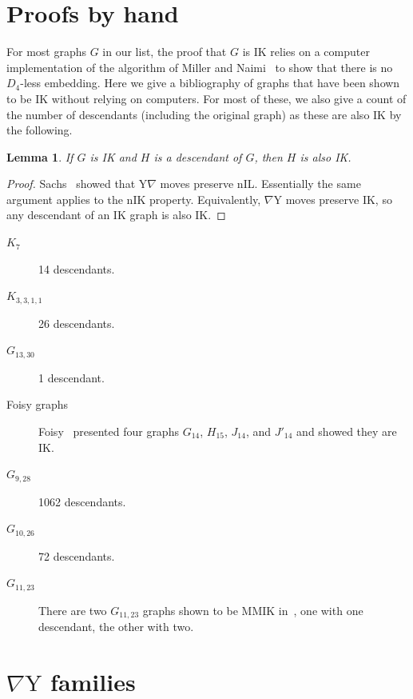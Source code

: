 \documentclass{amsart}
\newtheorem{lemma}[theorem]{Lemma}
\theoremstyle{remark}
\newcommand{\ty}{\nabla\mathrm{Y}}
\newcommand{\yt}{\mathrm{Y}\nabla}
\begin{document}
{\section{Proofs by hand}
\label{sec:hand}
For most graphs $G$ in our list, the proof that $G$ is IK relies on a computer implementation of the algorithm of
Miller and Naimi~\cite{MN} to show that there is no $D_4$-less embedding. Here we give a bibliography
of graphs that have been shown to be IK without relying on computers. For most of these, we also
give a count of the number of descendants (including the original graph) as these are also IK by the following.
\begin{lemma} If $G$ is IK and $H$ is a descendant of $G$, then $H$ is also IK.
\label{lem:ty}
\end{lemma}

\begin{proof} Sachs~\cite{S} showed that $\yt$ moves preserve nIL. Essentially the same argument
applies to the nIK property. Equivalently, $\ty$ moves preserve IK, so any descendant of an IK graph
is also IK.
\end{proof}

\begin{description}
\item[$K_7$] \cite{CG} 14 descendants.
\item[$K_{3,3,1,1}$] \cite{F} 26 descendants.
\item[$G_{13,30}$] \cite{F2} 1 descendant.
\item[Foisy graphs] Foisy~\cite{F3} presented four graphs $G_{14}$, $H_{15}$, $J_{14}$, and $J'_{14}$ and showed 
they are IK.
\item[$G_{9,28}$] \cite{GMN} 1062 descendants.
\item[$G_{10,26}$] \cite{MNPP} 72 descendants.
\item[$G_{11,23}$] There are two $G_{11,23}$ graphs shown to be MMIK in~\cite{KM}, one with one descendant, the other with two.
\end{description}

\section{$\ty$ families}
\label{sec:TYfam}

}
\end{document}
